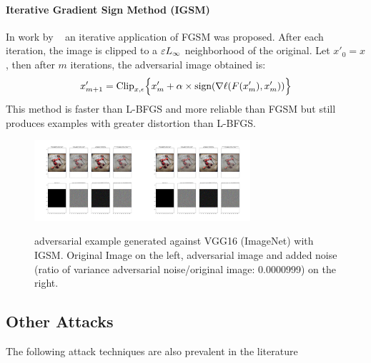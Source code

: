 \paragraph{Iterative Gradient Sign Method (IGSM)}
\label{igsm-s}
In work by ~\citet{kurakin_adversarial_2016}
  an iterative application of FGSM was proposed. After each
  iteration, the image is clipped to a $\varepsilon L_\infty$ neighborhood of the original. Let $x'_0 = x$, then after $m$ iterations, the adversarial image obtained is:
\begin{equation}
x_{m+1}' = \text{Clip}_{x,\epsilon} \Bigl\{x_m' + \alpha \times \text{sign}(\nabla \ell (F(x'_m),x'_m))  \Bigr\} 
\label{igsm}
\end{equation}
This method is faster than L-BFGS and more reliable than FGSM but still produces examples with greater distortion than L-BFGS. 
\begin{figure}[H]
  \centering
\includegraphics[trim=200 110 1200 102, clip,width=4cm]{c1_figures/ILSVRC2012_val_00002900summary_plot.png}\includegraphics[trim=900 110 500 102, clip,width=4cm]{c1_figures/ILSVRC2012_val_00002900summary_plot.png}
\label{fgsmhip}
\caption{adversarial example generated against VGG16 (ImageNet) with IGSM. Original Image on the left, adversarial image and added noise (ratio of variance adversarial noise/original image: 0.0000999) on the right. }
\end{figure}



\subsection{Other Attacks}
The following attack techniques are also prevalent in the literature 


